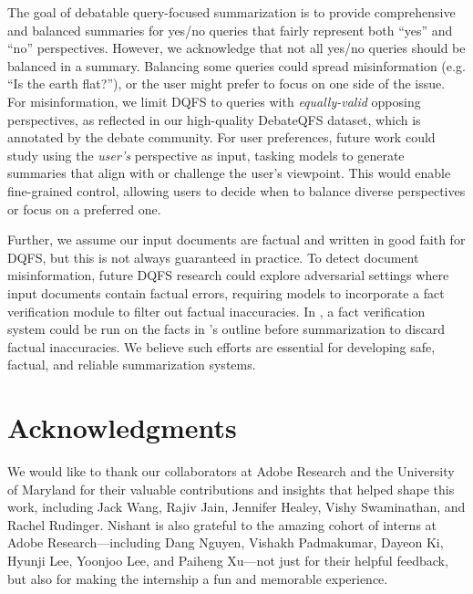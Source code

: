 The goal of debatable query-focused summarization is to provide comprehensive and balanced summaries for yes/no queries that fairly represent both ``yes'' and ``no'' perspectives.
However, we acknowledge that not all yes/no queries should be balanced in a summary.
Balancing some queries could spread misinformation (e.g. ``Is the earth flat?''), or the user might prefer to focus on one side of the issue.
For misinformation, we limit DQFS to queries with \textit{equally-valid} opposing perspectives, as reflected in our high-quality DebateQFS dataset, which is annotated by the debate community. 
For user preferences, future work could study using the \textit{user's} perspective as input, tasking models to generate summaries that align with or challenge the user's viewpoint. This would enable fine-grained control, allowing users to decide when to balance diverse perspectives or focus on a preferred one.

Further, we assume our input documents are factual and written in good faith for DQFS, but this is not always guaranteed in practice.
To detect document misinformation, future DQFS research could explore adversarial settings where input documents contain factual errors, requiring models to incorporate a fact verification module to filter out factual inaccuracies.
In \model, a fact verification system could be run on the facts in \model's outline before summarization to discard factual inaccuracies.
We believe such efforts are essential for developing safe, factual, and reliable summarization systems.

\section*{Acknowledgments}

We would like to thank our collaborators at Adobe Research and the University of Maryland for their valuable contributions and insights that helped shape this work, including Jack Wang, Rajiv Jain, Jennifer Healey, Vishy Swaminathan, and Rachel Rudinger.
Nishant is also grateful to the amazing cohort of interns at Adobe Research---including Dang Nguyen, Vishakh Padmakumar, Dayeon Ki, Hyunji Lee, Yoonjoo Lee, and Paiheng Xu---not just for their helpful feedback, but also for making the internship a fun and memorable experience.